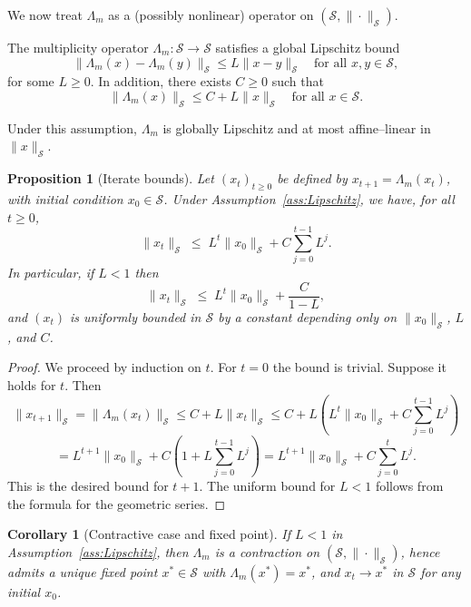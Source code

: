 \documentclass[11pt]{article}
\newtheorem{corollary}[theorem]{Corollary}
\newtheorem{proposition}[theorem]{Proposition}
\begin{document}
We now treat $\Lambda_m$ as a (possibly nonlinear) operator on $(\mathcal{S},\|\cdot\|_{\mathcal{S}})$.

\begin{assumption}\label{ass:Lipschitz}
The multiplicity operator $\Lambda_m : \mathcal{S} \to \mathcal{S}$ satisfies a global Lipschitz bound
\[
  \|\Lambda_m(x) - \Lambda_m(y)\|_{\mathcal{S}}
  \le L \|x - y\|_{\mathcal{S}}
  \quad \text{for all } x,y \in \mathcal{S},
\]
for some $L \ge 0$. In addition, there exists $C \ge 0$ such that
\[
  \|\Lambda_m(x)\|_{\mathcal{S}} \le C + L \|x\|_{\mathcal{S}}
  \quad \text{for all } x \in \mathcal{S}.
\]
\end{assumption}

Under this assumption, $\Lambda_m$ is globally Lipschitz and at most affine--linear in $\|x\|_{\mathcal{S}}$.

\begin{proposition}[Iterate bounds]\label{prop:iterate-bounds}
Let $(x_t)_{t \ge 0}$ be defined by $x_{t+1} = \Lambda_m(x_t)$, with initial condition $x_0 \in \mathcal{S}$. Under Assumption~\ref{ass:Lipschitz}, we have, for all $t \ge 0$,
\[
  \|x_t\|_{\mathcal{S}}
  \;\le\;
  L^t \|x_0\|_{\mathcal{S}} + C \sum_{j=0}^{t-1} L^j.
\]
In particular, if $L < 1$ then
\[
  \|x_t\|_{\mathcal{S}}
  \;\le\;
  L^t \|x_0\|_{\mathcal{S}} + \frac{C}{1-L},
\]
and $(x_t)$ is uniformly bounded in $\mathcal{S}$ by a constant depending only on $\|x_0\|_{\mathcal{S}}$, $L$, and $C$.
\end{proposition}

\begin{proof}
We proceed by induction on $t$. For $t=0$ the bound is trivial. Suppose it holds for $t$. Then
\[
  \|x_{t+1}\|_{\mathcal{S}}
  = \|\Lambda_m(x_t)\|_{\mathcal{S}}
  \le C + L \|x_t\|_{\mathcal{S}}
  \le C + L \left( L^t \|x_0\|_{\mathcal{S}} + C \sum_{j=0}^{t-1} L^j \right)
\]
\[
  = L^{t+1} \|x_0\|_{\mathcal{S}} + C \left( 1 + L \sum_{j=0}^{t-1} L^j \right)
  = L^{t+1} \|x_0\|_{\mathcal{S}} + C \sum_{j=0}^{t} L^j.
\]
This is the desired bound for $t+1$. The uniform bound for $L<1$ follows from the formula for the geometric series.
\end{proof}

\begin{corollary}[Contractive case and fixed point]\label{cor:fixed-point}
If $L < 1$ in Assumption~\ref{ass:Lipschitz}, then $\Lambda_m$ is a contraction on $(\mathcal{S},\|\cdot\|_{\mathcal{S}})$, hence admits a unique fixed point $x^\ast \in \mathcal{S}$ with $\Lambda_m(x^\ast) = x^\ast$, and $x_t \to x^\ast$ in $\mathcal{S}$ for any initial $x_0$.
\end{corollary}
\end{document}

